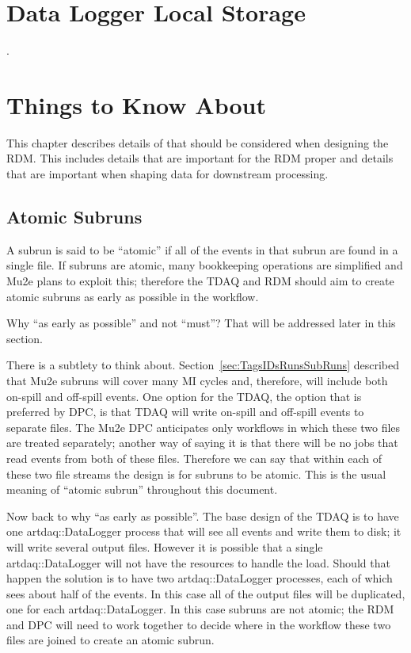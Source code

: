 \chapter{Data Logger Local Storage}
\label{app:DataLoggerLocalStorage}

.

\chapter{Things to Know About \art}

This chapter describes details of \art that should be considered when
designing the RDM.  This includes details that are important for the RDM
proper and details that are important when shaping data for downstream
processing.

\section{Atomic Subruns}

A subrun is said to be ``atomic'' if all of the events in that subrun are found in a single \art file.
If subruns are atomic, many bookkeeping operations are simplified and Mu2e plans to exploit this;
therefore the TDAQ and RDM should aim to create atomic subruns as early as possible in the workflow.

Why ``as early as possible'' and not ``must''? That will be addressed later in this section.

There is a subtlety to think about.
Section~\ref{sec:TagsIDsRunsSubRuns} described that Mu2e subruns will cover many MI cycles
and, therefore, will include both on-spill and off-spill events.
One option for the TDAQ, the option that is preferred by DPC,
is that TDAQ will write on-spill and off-spill events to separate files.
The Mu2e DPC anticipates only workflows in which these two files are treated separately;
another way of saying it is that there will be no jobs that read events from both of these files.
Therefore we can say that within each of these two file streams the design is for subruns to be atomic.
This is the usual meaning of ``atomic subrun'' throughout this document.

Now back to why ``as early as possible''.
The base design of the TDAQ is to have one {\code artdaq::DataLogger} process that will
see all events and write them to disk; it will write several output files.
However it is possible that a single {\code artdaq::DataLogger} will not have the
resources to handle the load.  Should that happen the solution is to have two
{\code artdaq::DataLogger} processes, each of which sees about half of the events.
In this case all of the output files will be duplicated,
one for each {\code artdaq::DataLogger}.
In this case subruns are not atomic;
the RDM and DPC will need to work together to decide where in the workflow these two files
are joined to create an atomic subrun.


